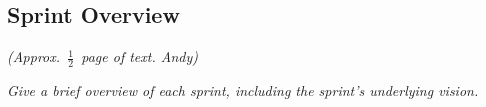 
\subsection{Sprint Overview}

\emph{(Approx.~$\frac{1}{2}$~page of text. Andy)}

\emph{Give a brief overview of each sprint, including the sprint's underlying vision.}

